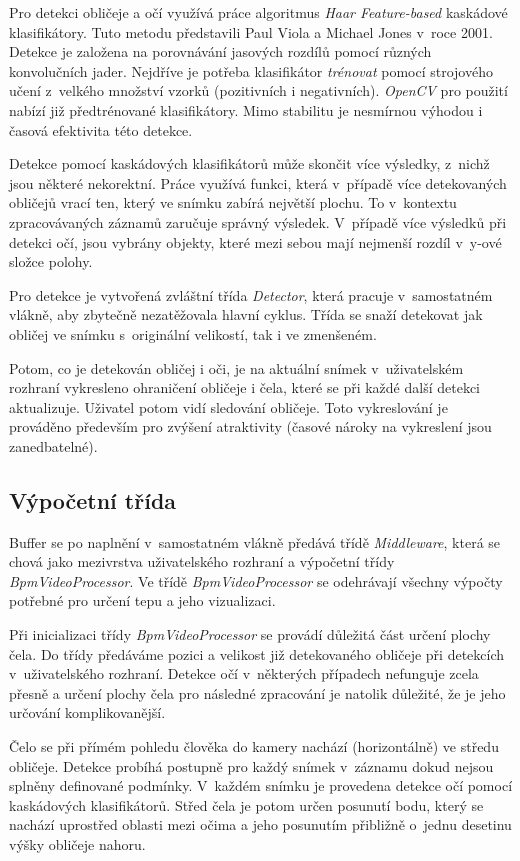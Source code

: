 \documentclass[
  digital, %
  table,   %
%
  lof,     %
  lot,     %
]{fithesis3}
\begin{document}
Pro detekci obličeje a očí využívá práce algoritmus \emph{Haar Feature-based} kaskádové klasifikátory. Tuto metodu představili Paul Viola a Michael Jones v~roce 2001. Detekce je založena na porovnávání jasových rozdílů pomocí různých konvolučních jader. Nejdříve je potřeba klasifikátor \emph{trénovat} pomocí strojového učení z~velkého množství vzorků (pozitivních i negativních). \emph{OpenCV} pro použití nabízí již předtrénované klasifikátory. Mimo stabilitu je nesmírnou výhodou i časová efektivita této detekce.

Detekce pomocí kaskádových klasifikátorů může skončit více výsledky, z~nichž jsou některé nekorektní. Práce využívá funkci, která v~případě více detekovaných obličejů vrací ten, který ve snímku zabírá největší plochu. To v~kontextu zpracovávaných záznamů zaručuje správný výsledek. V~případě více výsledků při detekci očí, jsou vybrány objekty, které mezi sebou mají nejmenší rozdíl v~y-ové složce polohy.

Pro detekce je vytvořená zvláštní třída \emph{Detector}, která pracuje v~samostatném vlákně, aby zbytečně nezatěžovala hlavní cyklus. Třída se snaží detekovat jak obličej ve snímku s~originální velikostí, tak i ve zmenšeném.

Potom, co je detekován obličej i oči, je na aktuální snímek v~uživatelském rozhraní vykresleno ohraničení obličeje i čela, které se při každé další detekci aktualizuje. Uživatel potom vidí sledování obličeje. Toto vykreslování je prováděno především pro zvýšení atraktivity (časové nároky na vykreslení jsou zanedbatelné).

\subsection{Výpočetní třída}
Buffer se po naplnění v~samostatném vlákně předává třídě \emph{Middleware}, která se chová jako mezivrstva uživatelského rozhraní a výpočetní třídy \emph{BpmVideoProcessor}. Ve třídě \emph{BpmVideoProcessor} se odehrávají všechny výpočty potřebné pro určení tepu a jeho vizualizaci. 

Při inicializaci třídy \emph{BpmVideoProcessor} se provádí důležitá část určení plochy čela. Do třídy předáváme pozici a velikost již detekovaného obličeje při detekcích v~uživatelského rozhraní. Detekce očí v~některých případech nefunguje zcela přesně a určení plochy čela pro následné zpracování je natolik důležité, že je jeho určování komplikovanější.

Čelo se při přímém pohledu člověka do kamery nachází (horizontálně) ve středu obličeje. Detekce probíhá postupně pro každý snímek v~záznamu dokud nejsou splněny definované podmínky. V~každém snímku je provedena detekce očí pomocí kaskádových klasifikátorů. Střed čela je potom určen posunutí bodu, který se nachází uprostřed oblasti mezi očima a jeho posunutím přibližně o~jednu desetinu výšky obličeje nahoru.
\end{document}
